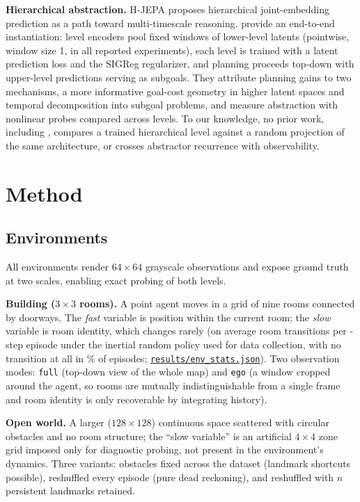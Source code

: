 \documentclass[11pt]{article}
\newcommand{\RepoURL}{https://github.com/r3gnnm/hier-abstraction-diagnostic}
\newcommand{\resfile}[1]{\href{\RepoURL/blob/main/results/#1}{\nolinkurl{results/#1}}}
\begin{document}
\textbf{Hierarchical abstraction.} H-JEPA \citep{lecun2022path} proposes hierarchical joint-embedding prediction as a path toward multi-timescale reasoning. \citet{zhang2026hjepa} provide an end-to-end instantiation: level encoders pool fixed windows of lower-level latents (pointwise, window size 1, in all reported experiments), each level is trained with a latent prediction loss and the SIGReg regularizer, and planning proceeds top-down with upper-level predictions serving as subgoals. They attribute planning gains to two mechanisms, a more informative goal-cost geometry in higher latent spaces and temporal decomposition into subgoal problems, and measure abstraction with nonlinear probes compared across levels. To our knowledge, no prior work, including \citet{zhang2026hjepa}, compares a trained hierarchical level against a random projection of the same architecture, or crosses abstractor recurrence with observability.

\section{Method}

\subsection{Environments}

All environments render $64\times64$ grayscale observations and expose ground truth at two scales, enabling exact probing of both levels.

\textbf{Building ($3\times3$ rooms).} A point agent moves in a grid of nine rooms connected by doorways. The \emph{fast} variable is position within the current room; the \emph{slow} variable is room identity, which changes rarely (on average \EnvTransitions{} room transitions per \EnvEpLen-step episode under the inertial random policy used for data collection, with no transition at all in \EnvNoTransitionPct\% of episodes; \resfile{env_stats.json}). Two observation modes: \texttt{full} (top-down view of the whole map) and \texttt{ego} (a window cropped around the agent, so rooms are mutually indistinguishable from a single frame and room identity is only recoverable by integrating history).

\textbf{Open world.} A larger ($128\times128$) continuous space scattered with circular obstacles and no room structure; the ``slow variable'' is an artificial $4\times4$ zone grid imposed only for diagnostic probing, not present in the environment's dynamics. Three variants: obstacles fixed across the dataset (landmark shortcuts possible), reshuffled every episode (pure dead reckoning), and reshuffled with $n$ persistent landmarks retained.
\end{document}
